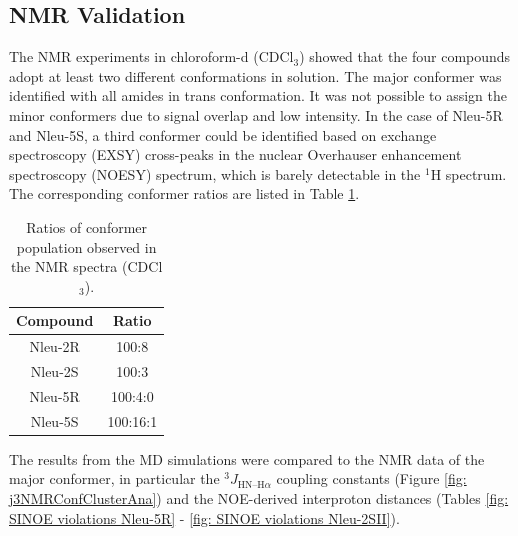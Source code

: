 \FloatBarrier

\subsection{NMR Validation}
The NMR experiments in chloroform-d (CDCl$_3$) showed that the four compounds adopt at least two different conformations in solution. \cite{Comeau2021}
The major conformer was identified with all amides in trans conformation. 
It was not possible to assign the minor conformers due to signal overlap and low intensity. In the case of Nleu-5R and Nleu-5S, a third conformer could be identified based on exchange spectroscopy (EXSY) cross-peaks in the nuclear Overhauser enhancement spectroscopy (NOESY) spectrum, which is barely detectable in the $^1$H spectrum. The corresponding conformer ratios are listed in Table \ref{tab: nmrConfRatios}.  

\begin{table}[h!]
    \centering
    \caption{Ratios of conformer population observed in the NMR spectra (CDCl$_3$).}
    \label{tab: nmrConfRatios}
    \begin{adjustbox}{max width=\textwidth}
    \begin{tabular}{cc}
    Compound & Ratio \\
    \hline
    Nleu-2R &	100:8 \\
    Nleu-2S &   100:3 \\
    Nleu-5R &   100:4:0 \\
    Nleu-5S &	100:16:1 \\
    \hline
    \end{tabular}
    \end{adjustbox}
\end{table}

The results from the MD simulations were compared to the NMR data of the major conformer, in particular the $^3J_{\text{HN–H}\alpha}$ coupling constants (Figure \ref{fig: j3NMRConfClusterAna}) and the NOE-derived interproton distances (Tables \ref{fig: SINOE violations Nleu-5R} - \ref{fig: SINOE violations Nleu-2SII}).

